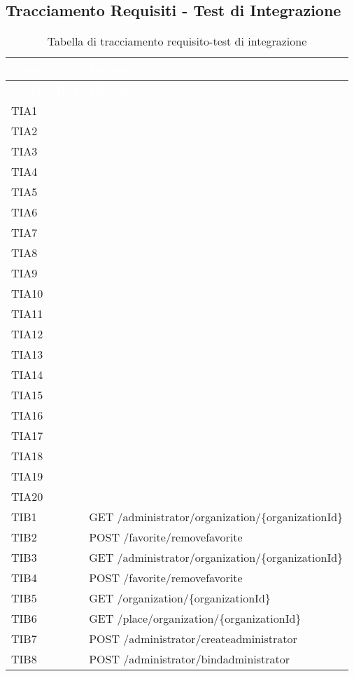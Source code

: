 \subsection{Tracciamento Requisiti - Test di Integrazione}
{
	\renewcommand{\arraystretch}{1.5}
	\centering
	\begin{longtable}{C{2cm} C{12cm}}
	\caption{Tabella di tracciamento requisito-test di integrazione}\\
	\textcolor{white}{\textbf{Codice Test}} & \textcolor{white}{\textbf{Metodo}}\\	
	\endfirsthead
	\textcolor{white}{\textbf{Codice Test}} & \textcolor{white}{\textbf{Metodo}}\\	
	\endhead
	
	TIA1 &  \\
	TIA2 &  \\
	TIA3 &  \\
	TIA4 &  \\
	TIA5 &  \\
	TIA6 &  \\
	TIA7 &  \\
	TIA8 &  \\
	TIA9 &  \\
	TIA10 &  \\
	TIA11 &  \\
	TIA12 &  \\
	TIA13 &  \\
	TIA14 &  \\
	TIA15 &  \\
	TIA16 &  \\
	TIA17 &  \\
	TIA18 &  \\
	TIA19 &  \\
	TIA20 &  \\
	TIB1 & GET /administrator/organization/\{organizationId\} \\
	TIB2 & POST /favorite/removefavorite \\
	TIB3 & GET /administrator/organization/\{organizationId\} \\
	TIB4 & POST /favorite/removefavorite \\
	TIB5 & GET /organization/\{organizationId\} \\
	TIB6 & GET /place/organization/\{organizationId\} \\
	TIB7 & POST /administrator/createadministrator \\
	TIB8 & POST /administrator/bindadministrator \\

\end{longtable}}
